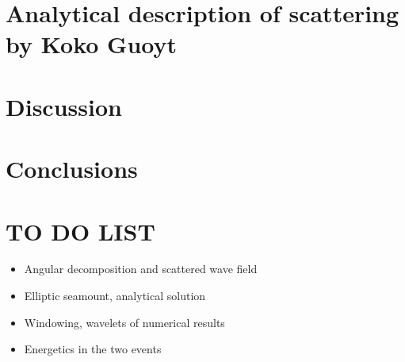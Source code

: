 \section{Analytical description of scattering by Koko Guoyt}

\section{Discussion}

\section{Conclusions}

\newpage
\section*{TO DO LIST}
\begin{itemize}
\item Angular decomposition and scattered wave field
\item Elliptic seamount, analytical solution
\item Windowing, wavelets of numerical results
\item Energetics in the two events
\end{itemize}




